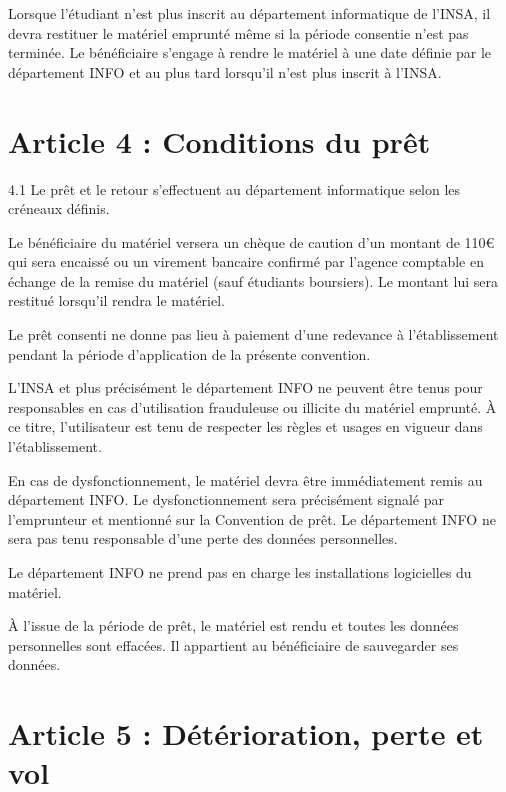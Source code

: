 \documentclass[12pt,a4paper]{article}
\begin{document}
Lorsque l’étudiant n’est plus inscrit au département informatique de l’INSA, il devra restituer le matériel emprunté même si la période consentie n’est pas terminée.  
Le bénéficiaire s’engage à rendre le matériel à une date définie par le département INFO et au plus tard lorsqu’il n’est plus inscrit à l’INSA.

\section*{Article 4 : Conditions du prêt}

4.1 Le prêt et le retour s’effectuent au département informatique selon les créneaux définis.

 Le bénéficiaire du matériel versera un chèque de caution d’un montant de 110€ qui sera encaissé ou un virement bancaire confirmé par l’agence comptable en échange de la remise du matériel (sauf étudiants boursiers). Le montant lui sera restitué lorsqu’il rendra le matériel.

 Le prêt consenti ne donne pas lieu à paiement d’une redevance à l’établissement pendant la période d’application de la présente convention.

 L’INSA et plus précisément le département INFO ne peuvent être tenus pour responsables en cas d’utilisation frauduleuse ou illicite du matériel emprunté. À ce titre, l’utilisateur est tenu de respecter les règles et usages en vigueur dans l’établissement.

 En cas de dysfonctionnement, le matériel devra être immédiatement remis au département INFO.  
Le dysfonctionnement sera précisément signalé par l’emprunteur et mentionné sur la Convention de prêt.  
Le département INFO ne sera pas tenu responsable d’une perte des données personnelles.

 Le département INFO ne prend pas en charge les installations logicielles du matériel.

 À l’issue de la période de prêt, le matériel est rendu et toutes les données personnelles sont effacées.  
Il appartient au bénéficiaire de sauvegarder ses données.

\section*{Article 5 : Détérioration, perte et vol}
\end{document}
